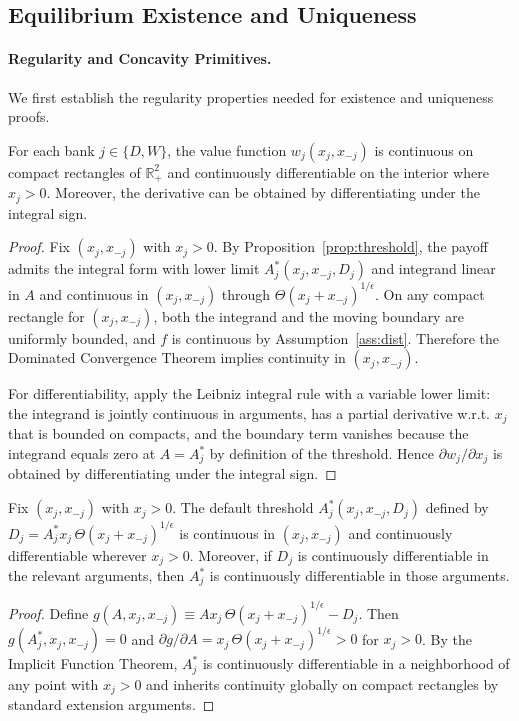 \documentclass[12pt]{article}
\begin{document}
\subsection{Equilibrium Existence and Uniqueness}

\paragraph{Regularity and Concavity Primitives.}
We first establish the regularity properties needed for existence and uniqueness proofs.
\begin{lemma}\label{lem:continuity-wj}
For each bank $j \in \{D,W\}$, the value function $w_j(x_j,x_{-j})$ is continuous on compact rectangles of $\mathbb{R}_{+}^{2}$ and continuously differentiable on the interior where $x_j>0$.
Moreover, the derivative can be obtained by differentiating under the integral sign.
\end{lemma}
\begin{proof}
Fix $(x_j,x_{-j})$ with $x_j>0$. By Proposition~\ref{prop:threshold}, the payoff admits the integral form with lower limit $A_j^*(x_j,x_{-j},D_j)$ and integrand linear in $A$ and continuous in $(x_j,x_{-j})$ through $\Theta(x_j+x_{-j})^{1/\epsilon}$. On any compact rectangle for $(x_j,x_{-j})$, both the integrand and the moving boundary are uniformly bounded, and $f$ is continuous by Assumption~\ref{ass:dist}. Therefore the Dominated Convergence Theorem implies continuity in $(x_j,x_{-j})$.

For differentiability, apply the Leibniz integral rule with a variable lower limit: the integrand is jointly continuous in arguments, has a partial derivative w.r.t. $x_j$ that is bounded on compacts, and the boundary term vanishes because the integrand equals zero at $A=A_j^*$ by definition of the threshold. Hence $\partial w_j/\partial x_j$ is obtained by differentiating under the integral sign.
\end{proof}

\begin{lemma}\label{lem:threshold-regularity}
Fix $(x_j,x_{-j})$ with $x_j>0$. The default threshold $A_j^*(x_j,x_{-j},D_j)$ defined by $D_j=A_j^* x_j\,\Theta(x_j+x_{-j})^{1/\epsilon}$ is continuous in $(x_j,x_{-j})$ and continuously differentiable wherever $x_j>0$. Moreover, if $D_j$ is continuously differentiable in the relevant arguments, then $A_j^*$ is continuously differentiable in those arguments.
\end{lemma}
\begin{proof}
Define $g(A, x_j, x_{-j}) \equiv A x_j\,\Theta(x_j+x_{-j})^{1/\epsilon}-D_j$. Then $g(A_j^*,x_j,x_{-j})=0$ and $\partial g/\partial A = x_j\,\Theta(x_j+x_{-j})^{1/\epsilon}>0$ for $x_j>0$. By the Implicit Function Theorem, $A_j^*$ is continuously differentiable in a neighborhood of any point with $x_j>0$ and inherits continuity globally on compact rectangles by standard extension arguments.
\end{proof}
\end{document}
